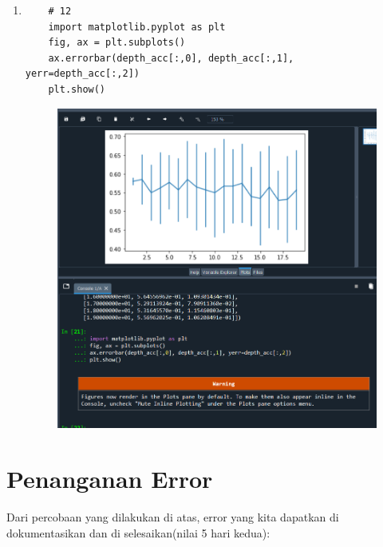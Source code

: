 \begin{enumerate}
\begin{figure}[!htbp]
\end{figure}
\item 
\begin{verbatim}
	# 12
	import matplotlib.pyplot as plt
	fig, ax = plt.subplots()
	ax.errorbar(depth_acc[:,0], depth_acc[:,1], yerr=depth_acc[:,2])
	plt.show()
\end{verbatim}
\begin{figure}[!htbp]
	\centering
	\includegraphics[scale=0.6]{figures/12.PNG}
\end{figure}
\newpage

\end{enumerate}


\section{Penanganan Error}
Dari percobaan yang dilakukan di atas, error yang kita dapatkan di dokumentasikan dan di selesaikan(nilai 5 hari kedua):

